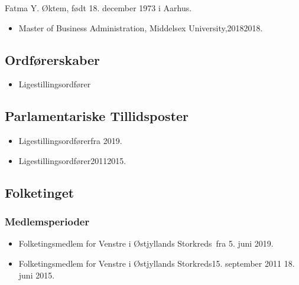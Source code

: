 \documentclass[11pt, a4paper]{awesome-cv}
\begin{document}
\makecvheader[R]
\makelettertitle
\begin{cvletter}
Fatma Y. Øktem, født 18. december 1973 i Aarhus.

\begin{itemize}
\item Master of Business Administration, Middelsex University,20182018.
\end{itemize}
\subsection*{Ordførerskaber}
\begin{itemize}
\item Ligestillingsordfører
\end{itemize}
\subsection*{Parlamentariske Tillidsposter}
\begin{itemize}
\item Ligestillingsordførerfra 2019.
\item Ligestillingsordfører20112015.
\end{itemize}
\subsection*{Folketinget}
\subsubsection*{Medlemsperioder}
\begin{itemize}
\item Folketingsmedlem for Venstre i Østjyllands Storkreds fra 5. juni 2019.
\item Folketingsmedlem for Venstre i Østjyllands Storkreds15. september 2011  18. juni 2015.
\end{itemize}

\end{cvletter}
\end{document}
